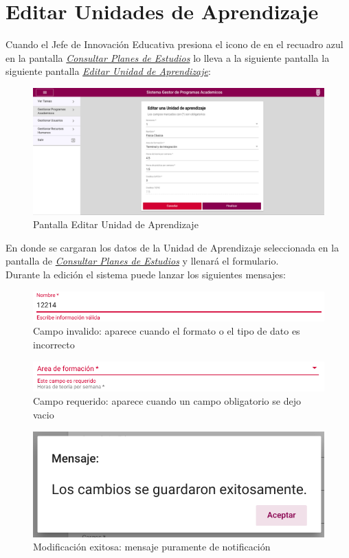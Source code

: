 \section{Editar Unidades de Aprendizaje}
Cuando el Jefe de Innovación Educativa presiona el icono de  en el recuadro azul en la pantalla \hyperlink{consultarUA}{\textit{Consultar Planes de Estudios}} lo lleva a la siguiente pantalla la siguiente pantalla \hyperlink{editarUA}{\textit{Editar Unidad de Aprendizaje}}:\\
\begin{figure}[!hbtp]
    \centering
    \hypertarget{editarUA}{\includegraphics[width=0.7\linewidth]{images/GUA/editarUA}}
    \caption{Pantalla Editar Unidad de Aprendizaje}
    \label{editarUA}
\end{figure}
En donde se cargaran los datos de la Unidad de Aprendizaje seleccionada en la pantalla de \hyperlink{consultarUA}{\textit{Consultar Planes de Estudios}}  y llenará el formulario.\\
Durante la edición el sistema puede lanzar los siguientes mensajes:\\
\begin{figure}[!hbtp]
    \centering
    \hypertarget{invalidoE}{\includegraphics[width=0.7\linewidth]{images/GUA/invalido}}
    \caption{Campo invalido: aparece cuando el formato o el tipo de dato es incorrecto}
    \label{invalidoE}
\end{figure}
\begin{figure}[!hbtp]
    \centering
    \hypertarget{requeridoE}{\includegraphics[width=0.7\linewidth]{images/GUA/requerido}}
    \caption{Campo requerido: aparece cuando un campo obligatorio se dejo vacio}
    \label{requeridoE}
\end{figure}
\begin{figure}[!hbtp]
    \centering
    \hypertarget{modificacion}{\includegraphics[width=0.7\linewidth]{images/GUA/modificacion}}
    \caption{Modificación exitosa: mensaje puramente de notificación}
    \label{modificacion}
\end{figure}
